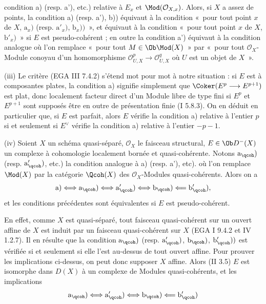 condition a) (resp. a'), etc.) relative à \(E_x\) et \(\Mod(\mathcal O_{X,x})\). Alors, si \(X\) a assez de points, la condition a) (resp. a'), b)) équivaut à la condition «~pour tout point \(x\) de \(X\), \(\mathrm a_x)\) (resp. \(\mathrm a'_x)\), \(\mathrm b_x))\)~», et équivaut à la condition «~pour tout point \(x\) de \(X\), \(\mathrm b'_x)\)~» si \(E\) est pseudo-cohérent ; en outre la condition a') équivaut à la condition analogue où l'on remplace «~pour tout \(M\in\Ob\Mod(X)\)~» par «~pour tout \(\mathcal O_X\)-Module conoyau d'un homomorphisme \(\mathcal O_{U,X}^p\longrightarrow\mathcal O_{U,X}^q\) où \(U\) est un objet de \(X\)~».

(iii) Le critère (EGA III 7.4.2) s'étend mot pour mot à notre situation : si \(E\) est à composantes plates, la condition a) signifie simplement que \(\Coker(E^p\longrightarrow E^{p+1})\) est plat, donc localement facteur direct d'un Module libre de type fini si \(E^p\) et \(E^{p+1}\) sont supposés être en outre de présentation finie (I 5.8.3). On en déduit en particulier que, si \(E\) est parfait, alors \(E\) vérifie la condition a) relative à l'entier \(p\) si et seulement si \(E^{\vee}\) vérifie la condition a) relative à l'entier \(-p-1\).

(iv) Soient \(X\) un schéma quasi-séparé, \(\mathcal O_X\) le faisceau structural, \(E\in\Ob D^-(X)\) un complexe à cohomologie localement bornée et quasi-cohérente. Notons \(\mathrm a_{\qcoh})\) (resp. \(\mathrm a'_{\qcoh})\), etc.) la condition analogue à a) (resp. a'), etc). où l'on remplace \(\Mod(X)\) par la catégorie \(\Qcoh(X)\) des \(\mathcal O_X\)-Modules quasi-cohérents. Alors on a
\[
 \mathrm a)\Longleftrightarrow\mathrm a_{\qcoh})\Longleftrightarrow\mathrm a'_{\qcoh})\Longleftrightarrow\mathrm b_{\qcoh})\Longleftarrow\mathrm b'_{\qcoh}),
\]
et les conditions précédentes sont équivalentes si \(E\) est pseudo-cohérent.

En effet, comme \(X\) est quasi-séparé, tout faisceau quasi-cohérent sur un ouvert affine de \(X\) est induit par un faisceau quasi-cohérent sur \(X\) (EGA I 9.4.2 et IV 1.2.7). Il en résulte que la condition \(\mathrm a_{\qcoh})\) (resp. \(\mathrm a'_{\qcoh})\), \(\mathrm b_{\qcoh})\), \(\mathrm b'_{\qcoh}))\) est vérifiée si et seulement si elle l'est au-dessus de tout ouvert affine. Pour prouver les implications ci-dessus, on peut donc supposer \(X\) affine. Alors (II 3.5) \(E\) est isomorphe dans \(D(X)\) à un complexe de Modules quasi-cohérents, et les implications
\[
 \mathrm a_{\qcoh})\Longleftrightarrow\mathrm a'_{\qcoh})\Longleftrightarrow\mathrm b_{\qcoh})\Longleftarrow\mathrm b'_{\qcoh})
\]
